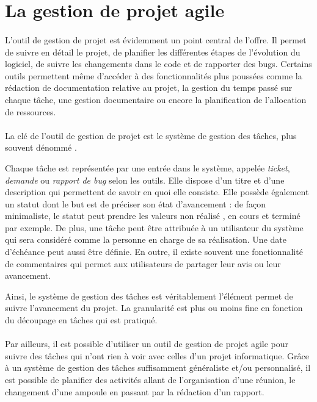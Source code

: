 \section{La gestion de projet agile}

\paragraph{}
L'outil de gestion de projet est évidemment un point central de l'offre.
Il permet de suivre en détail le projet, de planifier les différentes étapes de l'évolution du logiciel, de suivre les changements dans le code et de rapporter des bugs.
Certains outils permettent même d'accéder à des fonctionnalités plus poussées comme la rédaction de documentation relative au projet, la gestion du temps passé sur chaque tâche, une gestion documentaire ou encore la planification de l'allocation de ressources.

\paragraph{}
La clé de l'outil de gestion de projet est le système de gestion des tâches, plus souvent dénommé .

Chaque tâche est représentée par une entrée dans le système, appelée \textit{ticket}, \textit{demande} ou \textit{rapport de bug} selon les outils.
Elle dispose d'un titre et d'une description qui permettent de savoir en quoi elle consiste.
Elle possède également un statut dont le but est de préciser son état d'avancement : de façon minimaliste, le statut peut prendre les valeurs \og non réalisé \fg, \og en cours \fg{} et \og terminé \fg{} par exemple.
De plus, une tâche peut être attribuée à un utilisateur du système qui sera considéré comme la personne en charge de sa réalisation.
Une date d'échéance peut aussi être définie.
En outre, il existe souvent une fonctionnalité de commentaires qui permet aux utilisateurs de partager leur avis ou leur avancement.

Ainsi, le système de gestion des tâches est véritablement l'élément permet de suivre l'avancement du projet.
La granularité est plus ou moins fine en fonction du découpage en tâches qui est pratiqué.

\paragraph{}
Par ailleurs, il est possible d'utiliser un outil de gestion de projet agile pour suivre des tâches qui n'ont rien à voir avec celles d'un projet informatique.
Grâce à un système de gestion des tâches suffisamment généraliste et/ou personnalisé, il est possible de planifier des activités allant de l'organisation d'une réunion, le changement d'une ampoule en passant par la rédaction d'un rapport.

